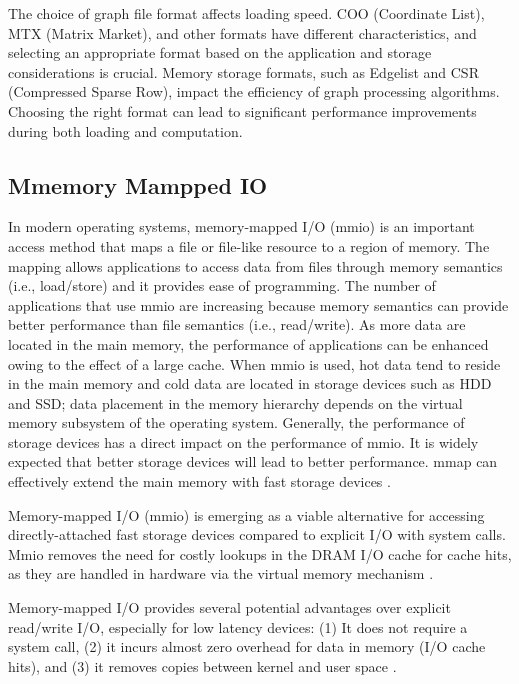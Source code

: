 The choice of graph file format affects loading speed. COO (Coordinate List), MTX (Matrix Market), and other formats have different characteristics, and selecting an appropriate format based on the application and storage considerations is crucial. Memory storage formats, such as Edgelist and CSR (Compressed Sparse Row), impact the efficiency of graph processing algorithms. Choosing the right format can lead to significant performance improvements during both loading and computation.


\subsection{Mmemory Mampped IO}
\label{sec:mmio}

In modern operating systems, memory-mapped I/O (mmio) is an important access method that maps a file or file-like resource to a region of memory. The mapping allows applications to access data from files through memory semantics (i.e., load/store) and it provides ease of programming. The number of applications that use mmio are increasing because memory semantics can provide better performance than file semantics (i.e., read/write). As more data are located in the main memory, the performance of applications can be enhanced owing to the effect of a large cache. When mmio is used, hot data tend to reside in the main memory and cold data are located in storage devices such as HDD and SSD; data placement in the memory hierarchy depends on the virtual memory subsystem of the operating system. Generally, the performance of storage devices has a direct impact on the performance of mmio. It is widely expected that better storage devices will lead to better performance. mmap can effectively extend the main memory with fast storage devices \cite{song2016efficient}.

Memory-mapped I/O (mmio) is emerging as a viable alternative for accessing directly-attached fast storage devices compared to explicit I/O with system calls. Mmio removes the need for costly lookups in the DRAM I/O cache for cache hits, as they are handled in hardware via the virtual memory mechanism \cite{malliotakis2021hugemap}.

Memory-mapped I/O provides several potential advantages over explicit read/write I/O, especially for low latency devices: (1) It does not require a system call, (2) it incurs almost zero overhead for data in memory (I/O cache hits), and (3) it removes copies between kernel and user space \cite{papagiannis2020optimizing}.

